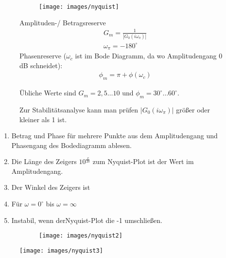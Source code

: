 \begin{tcolorbox}[colback=white!10!white,colframe=green!30!black,title=Nyquist] 
\begin{figure}[H]
    \begin{subfigure}{0.5\linewidth}
        \texttt{[image: images/nyquist]}
        \label{fig:nyquist}
    \end{subfigure}
    \begin{minipage}{0.45\linewidth}
        Amplituden-/ Betragsreserve 
        \begin{align*}
            &G_m = \frac{1}{|G_0(i\omega_\pi)|}\\
            & \omega_\pi = -180^{\circ}
        \end{align*}
        Phasenreserve ($\omega_c$ ist im Bode Diagramm, da wo Amplitudengang $0$dB schneidet):
        \begin{align*}
            &\phi_m = \pi + \phi(\omega_c)
        \end{align*}
        
    \end{minipage}
    Übliche Werte sind $G_m = 2,5 \ldots  10$ und $\phi_m = 30^{\circ} \dots 60^{\circ}  $. 
    
    Zur Stabilitätsanalyse kann man prüfen $|G_0(i\omega_\pi)| $ größer oder kleiner als 1 ist. 
\end{figure}
     \tcblower
     \begin{enumerate}
        \item Betrag und Phase für mehrere Punkte aus dem Amplitudengang und Phasengang des Bodediagramm ablesen. 
        \item Die Länge des Zeigers $10^{\frac{x}{20}}$ zum Nyquist-Plot ist der Wert im Amplitudengang.
        \item Der Winkel des Zeigers ist 
        \item Für $\omega = 0^{\circ}$ bis $\omega = \infty$
        \item Instabil, wenn derNyquist-Plot  die -1  umschließen.
     \end{enumerate}
     
 \begin{figure}[H]
     \begin{subfigure}{0.5\linewidth}
         \texttt{[image: images/nyquist2]}
     \end{subfigure}
     \begin{minipage}{0.45\linewidth}
         \texttt{[image: images/nyquist3]}     
     \end{minipage}
 
 \end{figure}
\end{tcolorbox}

